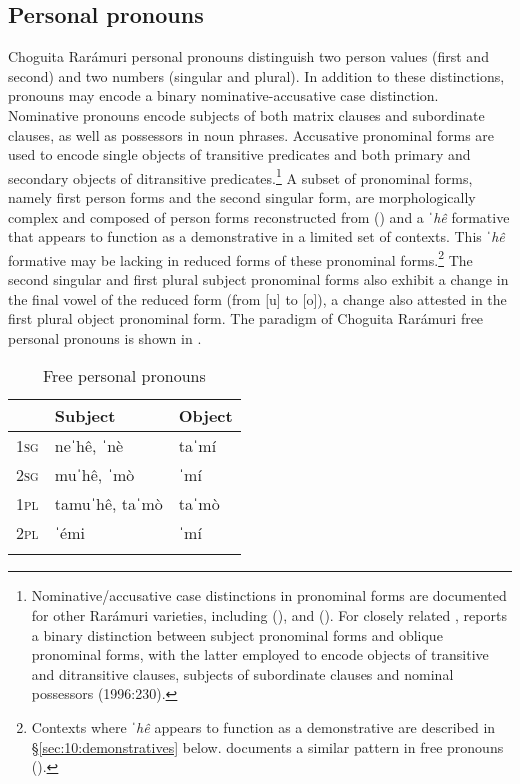 \subsection{Personal pronouns}
\label{subsec: personal pronouns}

Choguita Rarámuri personal pronouns distinguish two person values (first and second) and two numbers (singular and plural). In addition to these distinctions, pronouns may encode a binary nominative-accusative case distinction. Nominative pronouns encode subjects of both matrix clauses and subordinate clauses, as well as possessors in noun phrases. Accusative pronominal forms are used to encode single objects of transitive predicates and both primary and secondary objects of ditransitive predicates.\footnote{Nominative/accusative case distinctions in pronominal forms are documented for other Rarámuri varieties, including  (\citealt{brambila1953gramatica}), and  (\citealt{moralesmoreno2016rochecahi}). For closely related , \citet{miller1996guarijio} reports a binary distinction between subject pronominal forms and oblique pronominal forms, with the latter employed to encode objects of transitive and ditransitive clauses, subjects of subordinate clauses and nominal possessors (1996:230).} A subset of pronominal forms, namely first person forms and the second singular form, are morphologically complex and composed of person forms reconstructed from  (\citealt{langacker1977uto}) and a \textit{ˈhê} formative that appears to function as a demonstrative in a limited set of contexts. This \textit{ˈhê} formative may be lacking in reduced forms of these pronominal forms.\footnote{Contexts where \textit{ˈhê} appears to function as a demonstrative are described in §\ref{sec:10:demonstratives} below. \citet{villalpando2019grammatical} documents a similar pattern in  free pronouns (\citeyear[37]{villalpando2019grammatical}).} The second singular and first plural subject pronominal forms also exhibit a change in the final vowel of the reduced form (from [u] to [o]), a change also attested in the first plural object pronominal form. The paradigm of Choguita Rarámuri free personal pronouns is shown in .



\begin{table}
\caption{Free personal pronouns}
\label{tab:free-pronouns}

\begin{tabularx}{.5\textwidth}{lll}
\lsptoprule
& \textbf{Subject} & \textbf{Object}\\
\midrule
 \textsc{1sg} & neˈhê, ˈnè & taˈmí\\
 \textsc{2sg} & muˈhê, ˈmò & ˈmí\\
 \textsc{1pl} & tamuˈhê, taˈmò & taˈmò\\
 \textsc{2pl} & ˈémi & ˈmí\\
\lspbottomrule
\end{tabularx}
\end{table}
\hspace{1cm}

